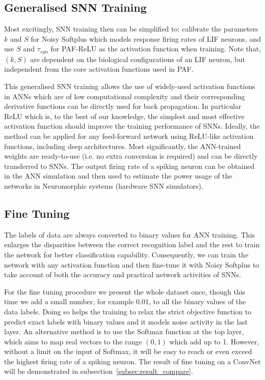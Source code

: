 \documentclass{article}
\begin{document}
\subsection{Generalised SNN Training}
\label{subsec:ns_train}                                                           Most excitingly, SNN training then can be simplified to: calibrate the parameters $k$ and $S$ for Noisy Softplus which models response firing rates of LIF neurons, and use $S$ and $\tau_{syn}$ for PAF-ReLU as the activation function when training.
Note that, $(k, S)$ are dependent on the biological configurations of an LIF neuron, but independent from the core activation functions used in PAF.

This generalised SNN training allows the use of widely-used activation functions in ANNs which are of low computational complexity and their corresponding derivative functions can be directly used for back propagation.
In particular ReLU which is, to the best of our knowledge, the simplest and most effective activation function should improve the training performance of SNNs.
Ideally, the method can be applied for any feed-forward network using ReLU-like activation functions, including deep architectures.
Most significantly, the ANN-trained weights are ready-to-use (i.e. no extra conversion is required) and can be directly transferred to SNNs. The output firing rate of a spiking neuron can be obtained in the ANN simulation and then used to estimate the power usage of the networks in Neuromorphic systems (hardware SNN simulators).



\subsection{Fine Tuning}
The labels of data are always converted to binary values for ANN training.
This enlarges the disparities between the correct recognition label and the rest to train the network for better classification capability.
Consequently, we can train the network with any activation function and then fine-tune it with Noisy Softplus to take account of both the accuracy and practical network activities of SNNs.


For the fine tuning procedure we present the whole dataset once, though this time we add a small number, for example 0.01, to all the binary values of the data labels.
Doing so helps the training to relax the strict objective function to predict exact labels with binary values and it models noise activity in the last layer.
An alternative method is to use the Softmax function at the top layer, which aims to map real vectors to the range $(0,1)$ which add up to 1. 
However, without a limit on the input of Softmax, it will be easy to reach or even exceed the highest firing rate of a spiking neuron.
The result of fine tuning on a ConvNet will be demonstrated in subsection~\ref{subsec:result_compare}.
\end{document}
